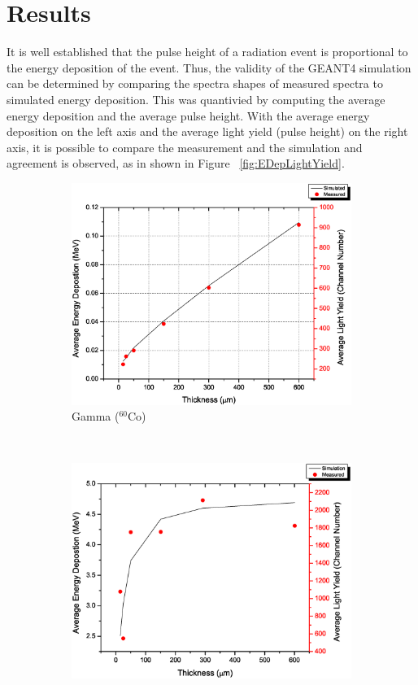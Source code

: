 \documentclass{anstrans}
\newcommand{\iso}[2]{${}^{#2}${#1}}
\newcommand{\figurewidth}{0.45\textwidth}
\begin{document}
\section{Results}
It is well established that the pulse height of a radiation event is proportional to the energy deposition of the event\cite{birks_scintillations_1951}.
Thus, the validity of the GEANT4 simulation can be determined by comparing the spectra shapes of measured spectra to simulated energy deposition.
This was quantivied by computing the average energy deposition and the average pulse height.
With the average energy deposition on the left axis and the average light yield (pulse height) on the right axis, it is possible to compare the measurement and the simulation and agreement is observed, as in shown in Figure ~\ref{fig:EDepLightYield}. 
\begin{figure}[!ht]
	\centering
	\begin{subfigure}[b]{\figurewidth}
    		\includegraphics[width=\textwidth]{G4EDep_LightYield_Co60}
		\caption{Gamma (\iso{Co}{60})}
	\end{subfigure}%
	~
	\begin{subfigure}[b]{\figurewidth}
    		\includegraphics[width=\textwidth]{G4EDep_LightYield_Neutron}

\end{subfigure}
\end{figure}
\end{document}
